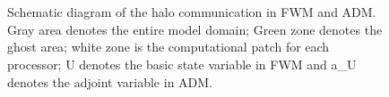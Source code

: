 \documentclass[12pt]{article}
\begin{document}
\begin{figure}[t]
     \begin{center}
%
        \\
        \\ %
%
    \end{center}
    \caption{%
        Schematic diagram of the halo communication in FWM and ADM. Gray area denotes the entire model domain; Green zone denotes the ghost area; white zone is the computational patch for each processor; U denotes the basic state variable in FWM and a\_U denotes the adjoint variable in ADM.
     }%
   \label{fig:mpi}
\end{figure}
\end{document}
